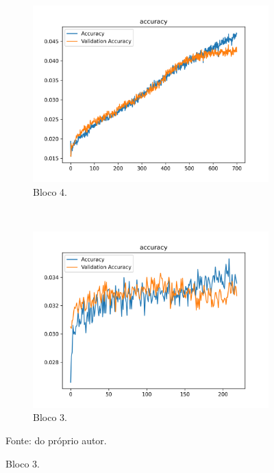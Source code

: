 \begin{figure}[H]
     \begin{subfigure}[t]{0.45\textwidth}
         \centering
         \includegraphics[width=1\linewidth]{recursos/imagens/results/food_accuracy2.png}
         \caption{Bloco 4.}
         \label{results:fig:datasets:3.3}
     \end{subfigure}
     ~
     \begin{subfigure}[t]{0.45\textwidth}
         \centering
         \includegraphics[width=1\linewidth]{recursos/imagens/results/food_accuracy3.png}
         \caption{Bloco 3.}
         \label{results:fig:datasets:3.4}
     \end{subfigure}
     
     Fonte: do próprio autor.
 \end{figure}

